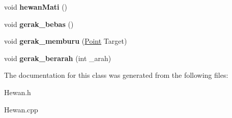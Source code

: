 \begin{DoxyCompactItemize}
\item 
void {\bfseries hewan\+Mati} ()\hypertarget{class_hewan_a2a5a54ebd082dbbd8b3ccee27c8233c1}{}\label{class_hewan_a2a5a54ebd082dbbd8b3ccee27c8233c1}

\item 
void {\bfseries gerak\+\_\+bebas} ()\hypertarget{class_hewan_a9e143b9a009a9c6931c5186fd6a01733}{}\label{class_hewan_a9e143b9a009a9c6931c5186fd6a01733}

\item 
void {\bfseries gerak\+\_\+memburu} (\hyperlink{class_point}{Point} Target)\hypertarget{class_hewan_a60d1ecc64ab1715a53c6b925046ef389}{}\label{class_hewan_a60d1ecc64ab1715a53c6b925046ef389}

\item 
void {\bfseries gerak\+\_\+berarah} (int \+\_\+arah)\hypertarget{class_hewan_ae6be604e19f5089778e0acb20d674c39}{}\label{class_hewan_ae6be604e19f5089778e0acb20d674c39}

\end{DoxyCompactItemize}


The documentation for this class was generated from the following files\+:\begin{DoxyCompactItemize}
\item 
Hewan.\+h\item 
Hewan.\+cpp\end{DoxyCompactItemize}
